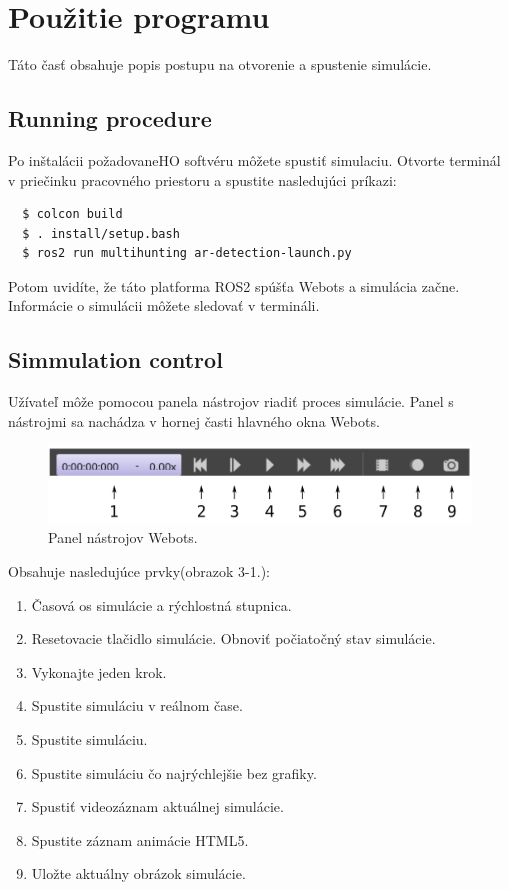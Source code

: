 \documentclass[a4paper]{feidippp}
\begin{document}
\section{Použitie programu}
Táto časť obsahuje popis postupu na otvorenie a spustenie simulácie.

\subsection{Running procedure}

Po inštalácii požadovaneHO softvéru môžete spustiť simulaciu. Otvorte terminál v priečinku pracovného priestoru a
spustite nasledujúci príkazi:
\begin{lstlisting}
  $ colcon build
  $ . install/setup.bash
  $ ros2 run multihunting ar-detection-launch.py
\end{lstlisting}

Potom uvidíte, že táto platforma ROS2 spúšťa Webots a simulácia začne. Informácie o simulácii môžete sledovať v termináli.

\subsection{Simmulation control}


Užívateľ môže pomocou panela nástrojov riadiť proces simulácie. Panel s nástrojmi sa nachádza v hornej časti hlavného okna Webots. 
\begin{figure}[ht!]
  \centering
  \includegraphics[width=.70\textwidth,angle=0]{1.png}
  \caption{Panel nástrojov Webots.}
  \label{o:1}
\end{figure}
\vspace{3mm}

\justifying
\noindent
Obsahuje nasledujúce prvky(obrazok 3-1.):
\begin{enumerate}
  \item Časová os simulácie a rýchlostná stupnica.
  \item Resetovacie tlačidlo simulácie. Obnoviť počiatočný stav simulácie.
  \item Vykonajte jeden krok.
  \item Spustite simuláciu v reálnom čase.
  \item Spustite simuláciu.
  \item Spustite simuláciu čo najrýchlejšie bez grafiky.
  \item Spustiť videozáznam aktuálnej simulácie.
  \item Spustite záznam animácie HTML5.
  \item Uložte aktuálny obrázok simulácie.
\end{enumerate}
\end{document}
